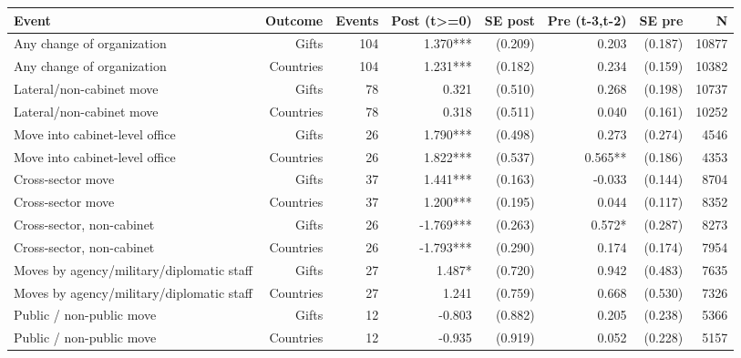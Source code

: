 \begin{tabular}{lrrrrrrr}
\toprule
Event & Outcome & Events & Post (t>=0) & SE post & Pre (t-3,t-2) & SE pre & N \\
\midrule
Any change of organization & Gifts & 104 & 1.370*** & (0.209) & 0.203 & (0.187) & 10877 \\
Any change of organization & Countries & 104 & 1.231*** & (0.182) & 0.234 & (0.159) & 10382 \\
Lateral/non-cabinet move & Gifts & 78 & 0.321 & (0.510) & 0.268 & (0.198) & 10737 \\
Lateral/non-cabinet move & Countries & 78 & 0.318 & (0.511) & 0.040 & (0.161) & 10252 \\
Move into cabinet-level office & Gifts & 26 & 1.790*** & (0.498) & 0.273 & (0.274) & 4546 \\
Move into cabinet-level office & Countries & 26 & 1.822*** & (0.537) & 0.565** & (0.186) & 4353 \\
Cross-sector move & Gifts & 37 & 1.441*** & (0.163) & -0.033 & (0.144) & 8704 \\
Cross-sector move & Countries & 37 & 1.200*** & (0.195) & 0.044 & (0.117) & 8352 \\
Cross-sector, non-cabinet & Gifts & 26 & -1.769*** & (0.263) & 0.572* & (0.287) & 8273 \\
Cross-sector, non-cabinet & Countries & 26 & -1.793*** & (0.290) & 0.174 & (0.174) & 7954 \\
Moves by agency/military/diplomatic staff & Gifts & 27 & 1.487* & (0.720) & 0.942 & (0.483) & 7635 \\
Moves by agency/military/diplomatic staff & Countries & 27 & 1.241 & (0.759) & 0.668 & (0.530) & 7326 \\
Public / non-public move & Gifts & 12 & -0.803 & (0.882) & 0.205 & (0.238) & 5366 \\
Public / non-public move & Countries & 12 & -0.935 & (0.919) & 0.052 & (0.228) & 5157 \\
\bottomrule
\end{tabular}
\par{}
